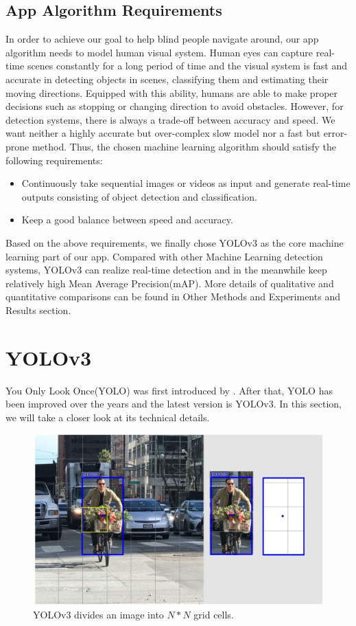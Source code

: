 \documentclass[letterpaper]{article} %
\begin{document}
\subsection{App Algorithm Requirements}
In order to achieve our goal to help blind people navigate around, our app algorithm needs to model human visual system. Human eyes can capture real-time scenes constantly for a long period of time and the visual system is fast and accurate in detecting objects in scenes, classifying them and estimating their moving directions. Equipped with this ability, humans are able to make proper decisions such as stopping or changing direction to avoid obstacles. However, for detection systems, there is always a trade-off between accuracy and speed. We want neither a highly accurate but over-complex slow model nor a fast but error-prone method. Thus, the chosen machine learning algorithm should satisfy the following requirements:
\begin{itemize}
    \item Continuously take sequential images or videos as input and generate real-time outputs consisting of object detection and classification.
    \item Keep a good balance between speed and accuracy.
\end{itemize}
Based on the above requirements, we finally chose YOLOv3\cite{YOLO} as the core machine learning part of our app. Compared with other Machine Learning detection systems, YOLOv3 can realize real-time detection and in the meanwhile keep relatively high Mean Average Precision(mAP)\cite{YOLO}. More details of qualitative and quantitative comparisons can be found in Other Methods and Experiments and Results section.

\section{YOLOv3}
You Only Look Once(YOLO) was first introduced by \cite{YOLO}. After that, YOLO has been improved over the years and the latest version is YOLOv3\cite{YOLOv3}. In this section, we will take a closer look at its technical details.
\begin{figure}[ht]
\hspace{-6mm}
\centering
\includegraphics[width=0.85\linewidth,height = 0.5\linewidth]{Figure/gridcells.JPG}
\caption{\footnotesize{YOLOv3 divides an image into $N*N$ grid cells.}}
\label{fig:cells}
\vspace{-2mm}
\end{figure}
\end{document}
